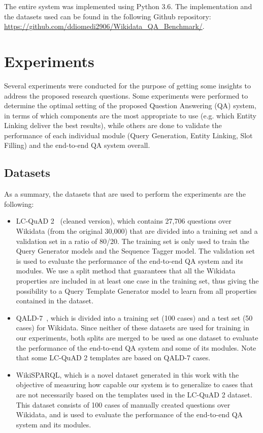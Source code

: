 The entire system was implemented using Python 3.6. The implementation and the datasets used can 
be found in the following Github repository: \url{https://github.com/ddiomedi2906/Wikidata_QA_Benchmark/}.

\section{Experiments}
\label{cap4:experimentalDesign/experiments}
Several experiments were conducted for the purpose of getting some insights to address the 
proposed research questions. Some experiments were performed to determine the optimal setting of 
the proposed Question Answering (QA) system, in terms of which components are the most 
appropriate to use (e.g. which Entity Linking deliver the best results), while others are done 
to validate the performance of each individual module (Query Generation, Entity Linking, Slot 
Filling) and the end-to-end QA system overall.

\subsection{Datasets}
\label{cap4:experimentalDesign/datasets}
As a summary, the datasets that are used to perform the experiments are the following:

\begin{itemize}
    \item LC-QuAD 2~\cite{dataset:lcquad2-DubeyBA019} (cleaned version), which contains 27,706 
    questions over Wikidata (from the original 30,000) that are divided into a training set and 
    a validation set in a ratio of 80/20. The training set is only used to train the Query 
    Generator models and the Sequence Tagger model. The validation set is used to evaluate the 
    performance of the end-to-end QA system and its modules. We use a split method that 
    guarantees that all the Wikidata properties are included in at least one case in the 
    training set, thus giving the possibility to a Query Template Generator model to learn from 
    all properties contained in the dataset.
    \item QALD-7~\cite{dataset:qald7-UsbeckNHKRN17}, which is divided into a training set (100 
    cases) and a test set (50 cases) for Wikidata. Since neither of these datasets are used for 
    training in our experiments, both splits are merged to be used as one dataset to evaluate 
    the performance of the end-to-end QA system and some of its modules. Note that some LC-QuAD 2 
    templates are based on QALD-7 cases.
    \item WikiSPARQL, which is a novel dataset generated in this work with the objective of 
    measuring how capable our system is to generalize to cases that are not necessarily based on 
    the templates used in the LC-QuAD 2 dataset. This dataset consists of 100 cases of manually 
    created questions over Wikidata, and is used to evaluate the performance of the end-to-end 
    QA system and its modules.
\end{itemize}

